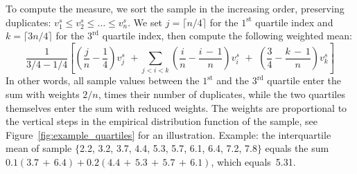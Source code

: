 \begin{Description}
To compute the measure, we sort the sample in the increasing order,
preserving duplicates: $v^s_1 \leq v^s_2 \leq \ldots \leq v^s_n$.
We set $j = \lceil n{/}4 \rceil$ for the $1^{\textrm{st}}$ quartile index
and $k = \lceil 3n{/}4 \rceil$ for the $3^{\textrm{rd}}$ quartile index,
then compute the following weighted mean:
\begin{equation*}
\frac{1}{3{/}4 - 1{/}4} \left[
\left(\frac{j}{n} - \frac{1}{4}\right) v^s_j \,\,+ 
\sum_{j<i<k} \left(\frac{i}{n} - \frac{i\,{-}\,1}{n}\right) v^s_i 
\,\,+\,\, \left(\frac{3}{4} - \frac{k\,{-}\,1}{n}\right) v^s_k\right]
\end{equation*}
In other words, all sample values between the $1^{\textrm{st}}$ and the $3^{\textrm{rd}}$
quartile enter the sum with weights $2{/}n$, times their number of duplicates, while the
two quartiles themselves enter the sum with reduced weights.  The weights are proportional
to the vertical steps in the empirical distribution function of the sample, see
Figure~\ref{fig:example_quartiles} for an illustration.
Example: the interquartile mean of sample
$\{$2.2, 3.2, 3.7, 4.4, 5.3, 5.7, 6.1, 6.4, 7.2, 7.8$\}$ equals the sum
$0.1 (3.7\,{+}\,6.4) + 0.2 (4.4\,{+}\,5.3\,{+}\,5.7\,{+}\,6.1)$,
which equals~5.31.
\end{Description}


